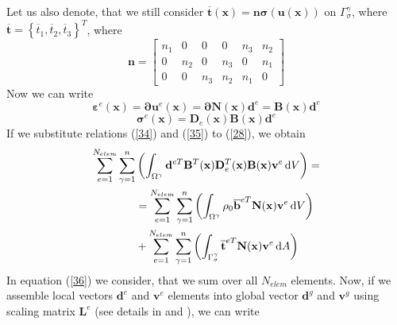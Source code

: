 \documentclass{article}
\newcommand{\dd}{\,{\rm d}}
\begin{document}
Let us also denote, that we still consider $\overline{\mathbf{t}}(\mathbf{x})=\mathbf{n} \bm{\sigma}(\mathbf{u}(\mathbf{x}))$ on $\Gamma^{\gamma}_{\sigma}$, where $\overline{\mathbf{t}}=\left\{\overline{t}_{1}, \overline{t}_{2}, \overline{t}_{3}\right\}^{T}$, where 
\begin{equation}\label{33}
\mathbf{n}=\left[\begin{array}{cccccc}{n_{1}} & {0} & {0} & {0} & {n_{3}} & {n_{2}} \\ {0} & {n_{2}} & {0} & {n_{3}} & {0} & {n_{1}} \\ {0} & {0} & {n_{3}} & {n_{2}} & {n_{1}} & {0}\end{array}\right]
\end{equation}
Now we can write 
\begin{equation}\label{34}
\bm{\varepsilon}^{e}(\mathbf{x})=\bm{\partial} \mathbf{u}^{e}(\mathbf{x}) = \bm{\partial} \mathbf{N}(\mathbf{x}) \mathbf{d}^{e}=\mathbf{B}(\mathbf{x}) \mathbf{d}^{e}
\end{equation}
\begin{equation}\label{35}
\bm{\sigma}^{e}(\mathbf{x}) = \mathbf{D}_{e}(\mathbf{x}) \mathbf{B}(\mathbf{x}) \mathbf{d}^{e}
\end{equation}
If we substitute relations (\ref{34}) and (\ref{35}) to (\ref{28}), we obtain
\begin{equation}\label{36}
\begin{aligned} 
\sum^{N_{elem}}_{e = 1}\sum^{n}_{\gamma = 1}&\left(\int_{\Omega^{\gamma}} \mathbf{d}^{eT} \mathbf{B}^{T}(\mathbf{x}) \mathbf{D}_{e}^{T}(\mathbf{x}) \mathbf{B}(\mathbf{x}) \mathbf{v}^{e} \dd V \right)=
\\
&=\sum^{N_{elem}}_{e = 1}\sum^{n}_{\gamma = 1}\left(\int_{\Omega^{\gamma}} \rho_{0}\overline{\mathbf{b}}^{eT} \mathbf{N}(\mathbf{x}) \mathbf{v}^{e} \dd V \right)
\\ 
&+\sum^{N_{elem}}_{e = 1}\sum^{n}_{\gamma = 1}\left(\int_{\Gamma^{\gamma}_{\sigma}} \overline{\mathbf{t}}^{eT} \mathbf{N}(\mathbf{x}) \mathbf{v}^{e} \dd A\right)
\end{aligned}
\end{equation}
In equation (\ref{36}) we consider, that we sum over all $ N_{elem} $ elements. 
Now, if we assemble local vectors $ \mathbf{d}^{e} $ and $ \mathbf{v}^{e} $ elements into global vector $ \mathbf{d}^{g} $ and $ \mathbf{v}^{g} $ using scaling matrix $ \mathbf{L}^{e} $ (see details in \cite{Zienkiewicz} and \cite{Zienkiewicz2}), we can write
\end{document}
